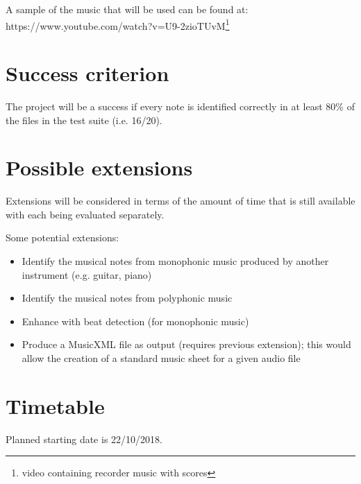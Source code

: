 \documentclass[12pt,a4paper,twoside]{article}
\begin{document}
A sample of the music that will be used can be found at: \\ https://www.youtube.com/watch?v=U9-2zioTUvM\footnote{video containing recorder music with scores}

\section*{Success criterion}

The project will be a success if every note is identified correctly in at least 80\% of the files in the test suite (i.e. 16/20).

\section*{Possible extensions}

Extensions will be considered in terms of the amount of time that is still available with each being evaluated separately.

Some potential extensions:
\begin{itemize}
    \item Identify the musical notes from monophonic music produced by another instrument (e.g. guitar, piano)
    \item Identify the musical notes from polyphonic music
    \item Enhance with beat detection (for monophonic music)
    \item Produce a MusicXML file as output (requires previous extension); this would allow the creation of a standard music sheet for a given audio file
\end{itemize}

\section*{Timetable}


Planned starting date is 22/10/2018.
\end{document}
